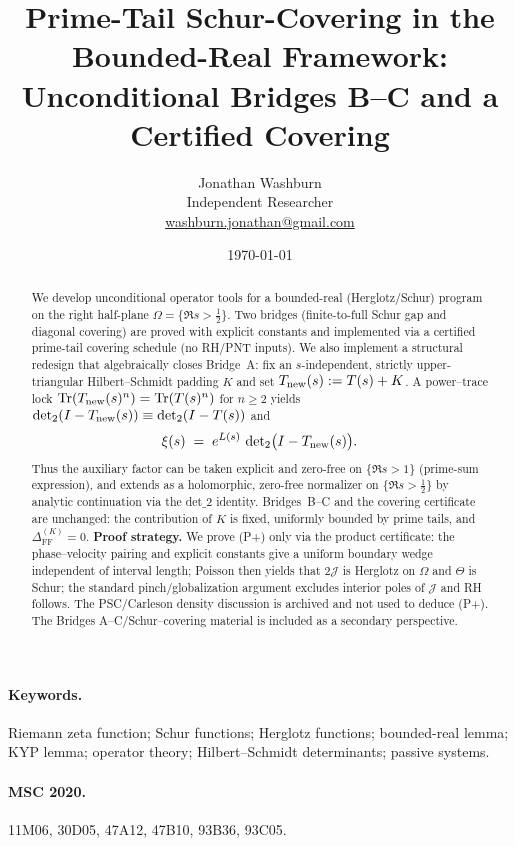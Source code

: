 \documentclass[11pt]{article}
\title{Prime-Tail Schur-Covering in the Bounded-Real Framework: Unconditional Bridges B--C and a Certified Covering}
\author{Jonathan Washburn\\ Independent Researcher\\ \href{mailto:washburn.jonathan@gmail.com}{washburn.jonathan@gmail.com}}
\date{\today}
\theoremstyle{definition}
\theoremstyle{remark}
\DeclareMathOperator{\Tr}{Tr}
\begin{document}
\maketitle

\begin{abstract}
We develop unconditional operator tools for a bounded-real (Herglotz/Schur) program on the right half-plane \(\Omega=\{\Re s>\tfrac12\}\). Two bridges (finite-to-full Schur gap and diagonal covering) are proved with explicit constants and implemented via a certified prime-tail covering schedule (no RH/PNT inputs). We also implement a structural redesign that algebraically closes Bridge~A: fix an \(s\)-independent, strictly upper-triangular Hilbert--Schmidt padding \(K\) and set \(T_{\rm new}(s):=T(s)+K\). A power--trace lock \(\Tr(T_{\rm new}(s)^n)=\Tr(T(s)^n)\) for \(n\ge 2\) yields \(\det_2(I-T_{\rm new}(s))\equiv\det_2(I-T(s))\) and
\[
  \xi(s)\;=\;e^{L(s)}\,\det\nolimits_2\!\big(I-T_{\rm new}(s)\big).
\]
Thus the auxiliary factor can be taken explicit and zero-free on \(\{\Re s>1\}\) (prime-sum expression), and extends as a holomorphic, zero-free normalizer on \(\{\Re s>\tfrac12\}\) by analytic continuation via the det$\_2$ identity. Bridges~B--C and the covering certificate are unchanged: the contribution of \(K\) is fixed, uniformly bounded by prime tails, and \(\Delta_{\mathrm{FF}}^{(K)}=0\).
\medskip\noindent\textbf{Proof strategy.} We prove (P+) only via the product certificate: the phase--velocity pairing and explicit constants give a uniform boundary wedge independent of interval length; Poisson then yields that \(2\mathcal J\) is Herglotz on \(\Omega\) and \(\Theta\) is Schur; the standard pinch/globalization argument excludes interior poles of \(\mathcal J\) and RH follows. The PSC/Carleson density discussion is archived and not used to deduce (P+). The Bridges A--C/Schur--covering material is included as a secondary perspective.
\end{abstract}

\paragraph{Keywords.} Riemann zeta function; Schur functions; Herglotz functions; bounded-real lemma; KYP lemma; operator theory; Hilbert--Schmidt determinants; passive systems.

\paragraph{MSC 2020.} 11M06, 30D05, 47A12, 47B10, 93B36, 93C05.
\end{document}
